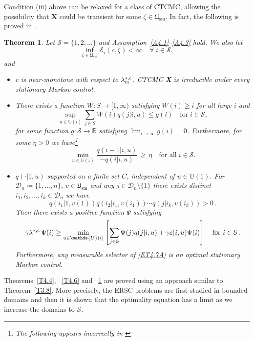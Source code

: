 \documentclass[notitlepage,11pt,reqno]{amsart}
\numberwithin{equation}{section}
\theoremstyle{plain}
\newtheorem{theorem}{Theorem}[section]
\theoremstyle{definition}
\theoremstyle{remark}
\newcommand{\Act}{{\mathds{U}}}
\newcommand{\sD}{{\mathscr{D}}}
\newcommand{\sE}{{\mathscr{E}}}     %
\newcommand{\cS}{{\mathcal{S}}}     %
\newcommand{\Usm}{\mathfrak{U}_{\mathrm{sm}}}
\newcommand{\lamstrcm}{\lambda^{*,{\rm c}}}
\newcommand{\RR}{\mathds{R}} %
\newcommand{\df}{\coloneqq}
\begin{document}
Condition \hyperlink{T4.6c}{(iii)} above can be relaxed for a class of CTCMC, allowing the possibility that $\textbf{X}$ could be transient for some $\zeta\in\Usm$. In fact,
the following is proved in \cite[Theorem~3.3]{MR4429406}.

\begin{theorem}\label{T4.7}
Let $\cS=\{1, 2, \ldots\}$ and Assumption~\ref{A4.1}--\ref{A4.3} hold. We also let 
$$\inf_{\zeta\in\Usm}\sE_i(c, \zeta)<\infty\quad \forall \; i\in\cS,$$
and 
\begin{itemize}
\item[(i)] $c$ is near-monotone with respect to $\lamstrcm_{\rm m}$. CTCMC \textbf{X} is irreducible under every stationary Markov control.
\item[(ii)] There exists a function $W:S\to [1, \infty)$ satisfying $W(i)\geq i$ for all large $i$ and 
\begin{equation*}
\sup_{u\in\Act(i)}\sum_{j\in S} W(i) q(j|i, u)\leq g(i)\quad \text{for}\; i\in \cS,
\end{equation*}
for some function $g:\cS\to \RR$ satisfying $\lim_{i\to\infty} g(i)=0$. Furthermore, for some
$\eta>0$ we have\footnote{The following appears incorrectly in \cite{MR4429406}}
\begin{equation*}
\min_{u\in\Act(i)}\frac{q(i-1|i, u)}{-q(i|i, u)}\,\geq\, \eta\quad \text{for all}\; i\in \cS.
\end{equation*}

\item[(iii)] $q(\cdot|1, u)$ supported on a finite set $C$, independent of $u\in\Act(1)$. 
For $\sD_n\df\{1, \ldots, n\}$, $v\in\Usm$ and any $j\in\sD_n\setminus\{1\}$ there exists
distinct $i_1, i_2, \ldots, i_k\in \sD_n$ we have
\begin{equation*}
q(i_1|1, v(1))q(i_2|i_1, v(i_1))\cdots q(j|i_k, v(i_k))>0\,.
\end{equation*}
Then there exists a positive function $\Psi$ satisfying
\begin{equation}\label{ET4.7A}
\gamma\lamstrcm\, \Psi(i) \geq \min_{u\in\Act(i)}\left[\sum_{j\in \cS} \Psi(j)q(j|i,u)
+ \gamma c(i, u)\Psi(i)\right]\quad\text{for}\,\, i\in \cS\,.
\end{equation}
Furthermore,  any measurable selector of \eqref{ET4.7A} is an
optimal stationary Markov control.
\end{itemize}
\end{theorem}
Theorems~\ref{T4.4}, ~\ref{T4.6} and ~\ref{T4.7} are proved using an approach similar to Theorem~\ref{T3.8}. More precisely, the ERSC problems are first studied in
bounded domains and then it is shown that the optimality equation has a limit as we increase the domains to $\cS$. 
\end{document}
